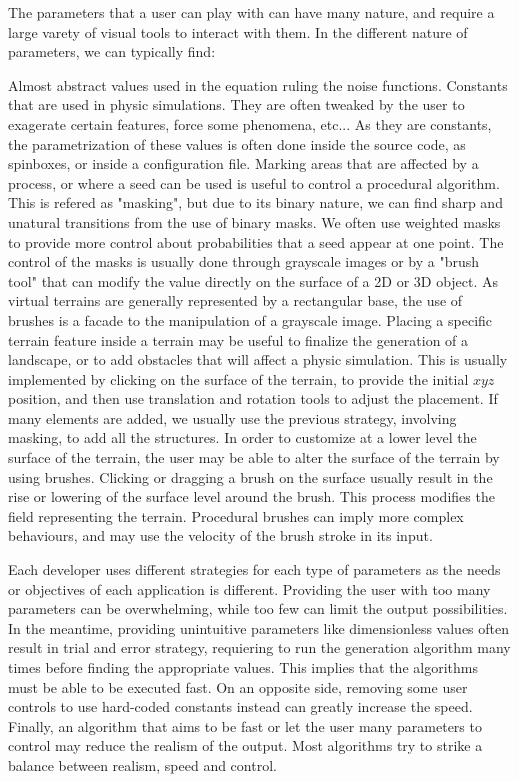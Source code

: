 The parameters that a user can play with can have many nature, and require a large varety of visual tools to interact with them. In the different nature of parameters, we can typically find: 
\begin{Itemize}
     Almost abstract values used in the equation ruling the noise functions. 
     Constants that are used in physic simulations. They are often tweaked by the user to exagerate certain features, force some phenomena, etc... As they are constants, the parametrization of these values is often done inside the source code, as spinboxes, or inside a configuration file. 
     Marking areas that are affected by a process, or where a seed can be used is useful to control a procedural algorithm. This is refered as "masking", but due to its binary nature, we can find sharp and unatural transitions from the use of binary masks. We often use weighted masks to provide more control about probabilities that a seed appear at one point. The control of the masks is usually done through grayscale images or by a "brush tool" that can modify the value directly on the surface of a 2D or 3D object. As virtual terrains are generally represented by a rectangular base, the use of brushes is a facade to the manipulation of a grayscale image.
     Placing a specific terrain feature inside a terrain may be useful to finalize the generation of a landscape, or to add obstacles that will affect a physic simulation. This is usually implemented by clicking on the surface of the terrain, to provide the initial $xyz$ position, and then use translation and rotation tools to adjust the placement. If many elements are added, we usually use the previous strategy, involving masking, to add all the structures.
     In order to customize at a lower level the surface of the terrain, the user may be able to alter the surface of the terrain by using brushes. Clicking or dragging a brush on the surface usually result in the rise or lowering of the surface level around the brush. This process modifies the field representing the terrain. Procedural brushes can imply more complex behaviours, and may use the velocity of the brush stroke in its input.
\end{Itemize}

Each developer uses different strategies for each type of parameters as the needs or objectives of each application is different. Providing the user with too many parameters can be overwhelming, while too few can limit the output possibilities. In the meantime, providing unintuitive parameters like dimensionless values often result in trial and error strategy, requiering to run the generation algorithm many times before finding the appropriate values. This implies that the algorithms must be able to be executed fast. On an opposite side, removing some user controls to use hard-coded constants instead can greatly increase the speed. Finally, an algorithm that aims to be fast or let the user many parameters to control may reduce the realism of the output. Most algorithms try to strike a balance between realism, speed and control.

